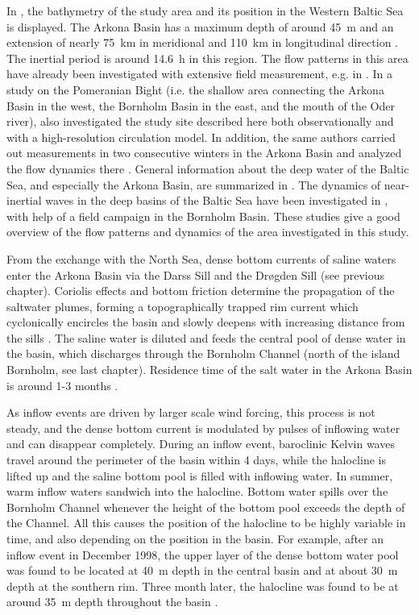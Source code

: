 In , the bathymetry of the study area and its position in the 
Western Baltic Sea is displayed. The Arkona Basin has a maximum depth of 
around 45~m and an \FloatBarrier extension of nearly 75~km in meridional and 
110~km in 
longitudinal direction \citep[][]{lass2005}. The inertial 
period is around 14.6~h in this region. The flow patterns in 
this area 
have already been investigated with extensive field measurement, e.g. in 
\cite{lass1993}. In a study on the Pomeranian Bight (i.e. the shallow area 
connecting the Arkona Basin in the west, the Bornholm Basin in the east, and 
the mouth of the Oder river), \cite{lass2001} also investigated 
the study site described here both observationally and with a high-resolution 
circulation model. In addition, the same authors carried out measurements in 
two consecutive winters in the Arkona Basin and analyzed the flow dynamics 
there \citep[][]{lass2003,lass2005}. General information about the deep water 
of the Baltic Sea, and especially the Arkona Basin, are summarized in 
\cite{meier2006}. The dynamics of near-inertial waves in the deep basins 
of the Baltic Sea have been investigated in \cite{vanderlee2011}, with help of 
a field campaign in the Bornholm Basin. These studies give a good overview of 
the flow patterns and dynamics of the area investigated in this study.

From the exchange with the North Sea, dense bottom currents of saline waters 
enter the Arkona Basin via the Darss Sill and the Dr{\o}gden Sill (see 
previous chapter). Coriolis effects and bottom friction determine the 
propagation of the saltwater plumes, forming a topographically trapped rim 
current which cyclonically encircles the basin and slowly deepens with 
increasing distance from the sills \citep{lass2005}. The saline water is 
diluted and feeds the central pool of dense water in the basin, which 
discharges through the Bornholm Channel (north of the island Bornholm, see last 
chapter). Residence time of the salt water in the Arkona Basin is around 1-3 
months \citep[][]{lass2005, meier2006}.

As inflow events are driven by larger scale wind forcing, this process is not 
steady, and the dense bottom current is modulated by pulses of inflowing 
water and can disappear completely. During an inflow event, baroclinic Kelvin 
waves travel around the perimeter of the basin within 4 days, while the 
halocline is lifted up 
and the saline bottom pool is filled with inflowing water. In summer, warm 
inflow waters sandwich into the halocline. Bottom 
water spills over the Bornholm Channel whenever the height of the bottom pool 
exceeds the depth of the Channel. All this causes the position of the halocline 
to be highly variable in time, and also depending on the position in the basin. 
For example, after an inflow event in December 1998, the upper layer of 
the dense bottom water pool was found to be located at 40~m depth in the central 
basin and at about 30~m depth at the southern rim. Three month later, the 
halocline was found to be at around 35~m depth throughout the basin 
\citep[][]{lass2005}.

